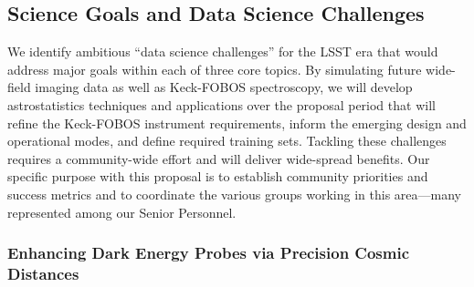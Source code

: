 \documentclass[oneside,11pt]{amsart}
\newcommand{\comment}[2][todo]{{\color{#1}[[{\bf #2}]]}}
\begin{document}



\subsection{Science Goals and Data Science Challenges}
\label{sec:goals}

We identify ambitious ``data science challenges'' for the LSST era that would address major goals within each of three
core topics.  By simulating future wide-field imaging data as well as Keck-FOBOS spectroscopy, we will develop
astrostatistics techniques and applications over the proposal period that will refine the Keck-FOBOS instrument
requirements, inform the emerging design and operational modes, and define required training sets.  Tackling these
challenges requires a community-wide effort and will deliver wide-spread benefits.  Our specific purpose with this
proposal is to establish community priorities and success metrics and to coordinate the various groups working in this
area---many represented among our Senior Personnel.

\subsubsection{Enhancing Dark Energy Probes via Precision Cosmic Distances}
\label{sec:cosmology}

\end{document}
